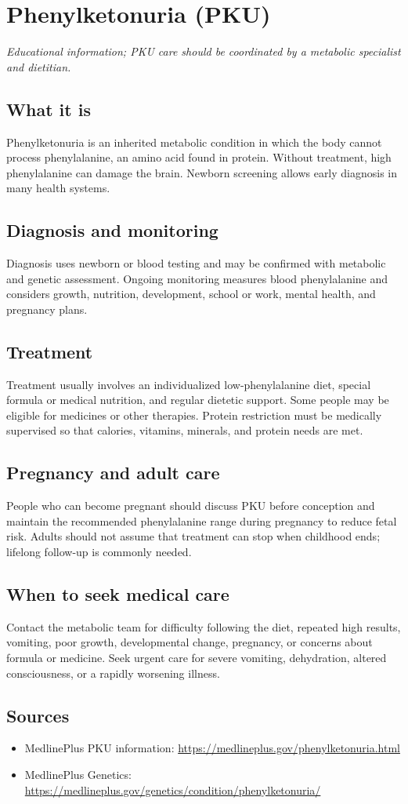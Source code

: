 \chapter{Phenylketonuria (PKU)}

\medskip
\noindent\textit{Educational information; PKU care should be coordinated by a metabolic specialist and dietitian.}

\section*{What it is}
Phenylketonuria is an inherited metabolic condition in which the body cannot process phenylalanine, an amino acid found in protein. Without treatment, high phenylalanine can damage the brain. Newborn screening allows early diagnosis in many health systems.

\section*{Diagnosis and monitoring}
Diagnosis uses newborn or blood testing and may be confirmed with metabolic and genetic assessment. Ongoing monitoring measures blood phenylalanine and considers growth, nutrition, development, school or work, mental health, and pregnancy plans.

\section*{Treatment}
Treatment usually involves an individualized low-phenylalanine diet, special formula or medical nutrition, and regular dietetic support. Some people may be eligible for medicines or other therapies. Protein restriction must be medically supervised so that calories, vitamins, minerals, and protein needs are met.

\section*{Pregnancy and adult care}
People who can become pregnant should discuss PKU before conception and maintain the recommended phenylalanine range during pregnancy to reduce fetal risk. Adults should not assume that treatment can stop when childhood ends; lifelong follow-up is commonly needed.

\section*{When to seek medical care}
Contact the metabolic team for difficulty following the diet, repeated high results, vomiting, poor growth, developmental change, pregnancy, or concerns about formula or medicine. Seek urgent care for severe vomiting, dehydration, altered consciousness, or a rapidly worsening illness.

\section*{Sources}
\begin{itemize}
\item MedlinePlus PKU information: \url{https://medlineplus.gov/phenylketonuria.html}
\item MedlinePlus Genetics: \url{https://medlineplus.gov/genetics/condition/phenylketonuria/}
\end{itemize}
